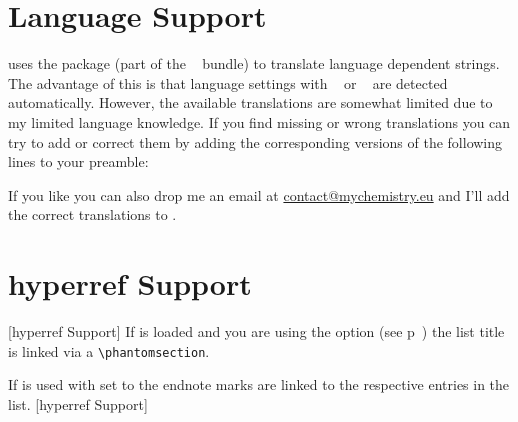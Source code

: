 \documentclass[toc=bib,toc=index]{cnpkgdoc}
\begin{document}
\section{Language Support}
\enotez uses the  package (part of the
~\cite{pkg:exsheets} bundle) to translate language dependent
strings. The advantage of this is that language settings with
~\cite{pkg:babel} or ~\cite{pkg:polyglossia}
are detected automatically. However, the available translations are somewhat
limited due to my limited language knowledge. If you find missing or wrong
translations you can try to add or correct them by adding the corresponding
versions of the following lines to your preamble:
\begin{beispiel}
\end{beispiel}
If you like you can also drop me an email at
\href{mailto:contact@mychemistry.eu}{contact@mychemistry.eu} and I'll add the
correct translations to \enotez.

\section{hyperref Support}[hyperref Support]
If  is loaded and you are using the option  (see
p~\pageref{key:totoc}) the list title is linked via a \verb=\phantomsection=.

If  is used with  set to  the
endnote marks are linked to the respective entries in the list.
[hyperref Support]

\printendnotes[addsec]

\printbibliography


\printindex
\end{document}
